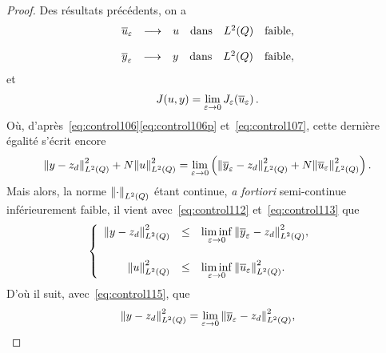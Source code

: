 \begin{proof}%
    Des résultats précédents, on a
    \begin{equation}\label{eq:control112}
        \begin{array}{rcllll}
            {\overline{u}}_{\varepsilon} & \longrightarrow & u & \text{dans} & L^{2}\!\left({Q}\right) &
            \text{faible},
        \end{array}
    \end{equation}

    \begin{equation}\label{eq:control113}
        \begin{array}{rcllll}
            {\overline{y}}_{\varepsilon} & \longrightarrow & y & \text{dans} & L^{2}\!\left({Q}\right) &
            \text{faible},
        \end{array}
    \end{equation}
    et
    \begin{equation*}
        J(u,y) = \lim_{\varepsilon\to 0}J_{\varepsilon}\!\left({{\overline{u}}_{\varepsilon}}\right).
    \end{equation*}
    Où,
    d'après~\eqref{eq:control106}\eqref{eq:control106p}
    et~\eqref{eq:control107}, cette dernière égalité s'écrit encore
    \begin{equation}\label{eq:control115}
        \normecq{y - z_{d}} + N\normecq{u} = \lim_{\veps\to 0}\left({%
            \normecq{\bareps{y} - z_{d}} + N\normecq{\bareps{u}}
        }\right).
    \end{equation}
    Mais alors, la norme ${\left\|{\cdot }\right\|}_{L^{2}\left({Q}\right)}$ étant continue, \textit{a
    fortiori} semi-continue inférieurement faible, il vient
    avec~\eqref{eq:control112} et~\eqref{eq:control113} que
    \begin{equation*}
        \begin{cases}\displaystyle
            \begin{array}{rcll}
                {\left\|{y - z_{d} }\right\|}_{L^{2}\left({Q}\right)}^{2} & \leq & \underset{\varepsilon\to
                0}{\lim\inf}\, {\left\|{{\overline{y}}_{\varepsilon} - z_{d} }\right\|}_{L^{2}\left({Q}\right)}^{2},\\
                \\
                {\left\|{u }\right\|}_{L^{2}\left({Q}\right)}^{2} & \leq & \underset{\varepsilon\to 0}{\lim\inf}\,
                {\left\|{{\overline{u}}_{\varepsilon} }\right\|}_{L^{2}\left({Q}\right)}^{2}.
            \end{array}
        \end{cases}
    \end{equation*}
    D'où il suit, avec~\eqref{eq:control115}, que
    \begin{equation}\label{eq:control118}
        \normecq{y -z_{d}} = \lim_{\veps\to 0}\normecq{\bareps{y} - z_{d}},

\end{equation}
\end{proof}
